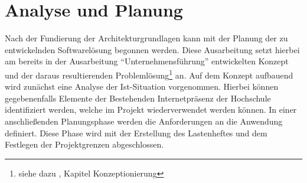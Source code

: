 \section{Analyse und Planung}
\label{sec:AnalyseUndPlanung}

Nach der Fundierung der Architekturgrundlagen kann mit der Planung der zu
entwickelnden Softwarelösung begonnen werden. Diese Ausarbeitung setzt hierbei
am bereits in der Ausarbeitung "`Unternehmensführung"' entwickelten Konzept und
der daraus resultierenden Problemlösung\footnote{siehe dazu
\citet{unternehmensfuehrung2014}, Kapitel Konzeptionierung} an. Auf dem Konzept
aufbauend wird zunächst eine Analyse der Ist-Situation vorgenommen. Hierbei
können gegebenenfalls Elemente der Bestehenden Internetpräsenz der Hochschule
identifiziert werden, welche im Projekt wiederverwendet werden können. In einer
anschließenden Planungsphase werden die Anforderungen an die Anwendung
definiert. Diese Phase wird mit der Erstellung des Lastenheftes und dem
Festlegen der Projektgrenzen abgeschlossen.




